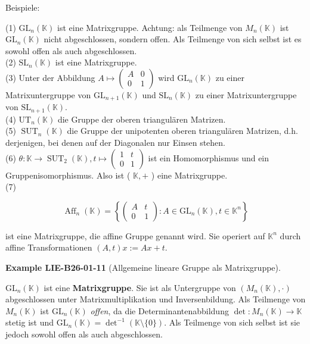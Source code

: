 \documentclass[10pt, letterpaper]{article}
\newcommand{\CustomHeading}[3]{%
  \par\medskip\noindent%
  \textbf{#1 #2} \textnormal{(#3)}.\enskip%
}
\newenvironment{EXA}[2]{\begin{unitbox}\CustomHeading{Example}{#1}{#2}}{\end{unitbox}}
\begin{document}
Beispiele:


(1) $\mathrm{GL}_{n}(\mathbb{K})$ ist eine Matrixgruppe. Achtung: als Teilmenge von $M_{n}(\mathbb{K})$ ist $\mathrm{GL}_{n}(\mathbb{K})$ nicht abgeschlossen, sondern offen. Als Teilmenge von sich selbst ist es sowohl offen als auch abgeschlossen.\\
(2) $\mathrm{SL}_{n}(\mathbb{K})$ ist eine Matrixgruppe.\\
(3) Unter der Abbildung $A \mapsto\left(\begin{array}{cc}A & 0 \\ 0 & 1\end{array}\right)$ wird $\mathrm{GL}_{n}(\mathbb{K})$ zu einer Matrixuntergruppe von $\mathrm{GL}_{n+1}(\mathbb{K})$ und $\mathrm{SL}_{n}(\mathbb{K})$ zu einer Matrixuntergruppe von $\mathrm{SL}_{n+1}(\mathbb{K})$.\\
(4) $\mathrm{UT}_{n}(\mathbb{K})$ die Gruppe der oberen triangulären Matrizen.\\
(5) $\operatorname{SUT}_{n}(\mathbb{K})$ die Gruppe der unipotenten oberen triangulären Matrizen, d.h. derjenigen, bei denen auf der Diagonalen nur Einsen stehen.\\
(6) $\theta: \mathbb{K} \rightarrow \operatorname{SUT}_{2}(\mathbb{K}), t \mapsto\left(\begin{array}{cc}1 & t \\ 0 & 1\end{array}\right)$ ist ein Homomorphismus und ein Gruppenisomorphismus. Also ist ( $\mathbb{K},+$ ) eine Matrixgruppe.\\
(7)

$$
\operatorname{Aff}_{n}(\mathbb{K})=\left\{\left(\begin{array}{cc}
A & t \\
0 & 1
\end{array}\right): A \in \mathrm{GL}_{n}(\mathbb{K}), t \in \mathbb{K}^{n}\right\}
$$

ist eine Matrixgruppe, die affine Gruppe genannt wird. Sie operiert auf $\mathbb{K}^{n}$ durch affine Transformationen $(A, t) x:=A x+ t$.\\



\begin{EXA}{LIE-B26-01-11}{Allgemeine lineare Gruppe als Matrixgruppe}
$\mathrm{GL}_{n}(\mathbb{K})$ ist eine \textbf{Matrixgruppe}.  
Sie ist als Untergruppe von $(M_{n}(\mathbb{K}),\cdot)$ abgeschlossen unter Matrixmultiplikation und Inversenbildung.  
Als Teilmenge von $M_{n}(\mathbb{K})$ ist $\mathrm{GL}_{n}(\mathbb{K})$ \emph{offen}, da die Determinantenabbildung $\det : M_{n}(\mathbb{K}) \to \mathbb{K}$ stetig ist und $\mathrm{GL}_{n}(\mathbb{K}) = \det^{-1}(\mathbb{K}\setminus\{0\})$.  
Als Teilmenge von sich selbst ist sie jedoch sowohl offen als auch abgeschlossen.
\end{EXA}
\end{document}
